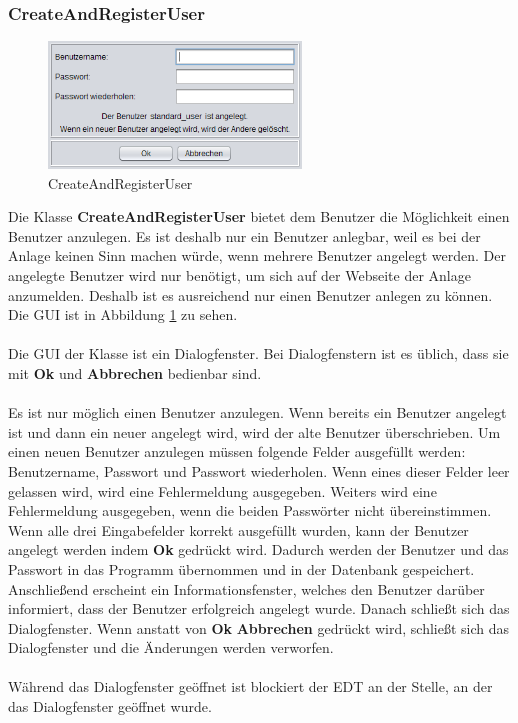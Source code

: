\subsubsection{CreateAndRegisterUser}
\begin{figure}
\vspace{-20pt}
  \begin{center}
    \includegraphics[width=0.60\textwidth]{Bilder/GUI/CreateUser}
  \end{center}
  \caption{CreateAndRegisterUser}
  \label{CreateAndRegisterUser}
  \vspace{10pt}
\end{figure}
Die Klasse \textbf{CreateAndRegisterUser} bietet dem Benutzer die Möglichkeit einen Benutzer anzulegen. Es ist deshalb nur ein Benutzer anlegbar, weil es bei der Anlage keinen Sinn machen würde, wenn mehrere Benutzer angelegt werden. Der angelegte Benutzer wird nur benötigt, um sich auf der Webseite der Anlage anzumelden. Deshalb ist es ausreichend nur einen Benutzer anlegen zu können. Die \ac{GUI} ist in Abbildung \ref{CreateAndRegisterUser} zu sehen.
\\ \\ Die \ac{GUI} der Klasse ist ein Dialogfenster. Bei Dialogfenstern ist es üblich, dass sie mit \textbf{Ok} und \textbf{Abbrechen} bedienbar sind.
\\ \\ Es ist nur möglich einen Benutzer anzulegen. Wenn bereits ein Benutzer angelegt ist und dann ein neuer angelegt wird, wird der alte Benutzer überschrieben. Um einen neuen Benutzer anzulegen müssen folgende Felder ausgefüllt werden: Benutzername, Passwort und Passwort wiederholen. Wenn eines dieser Felder leer gelassen wird, wird eine Fehlermeldung ausgegeben. Weiters wird eine Fehlermeldung ausgegeben, wenn die beiden Passwörter nicht übereinstimmen. Wenn alle drei Eingabefelder korrekt ausgefüllt wurden, kann der Benutzer angelegt werden indem \textbf{Ok} gedrückt wird. Dadurch werden der Benutzer und das Passwort in das Programm übernommen und in der Datenbank gespeichert. Anschließend erscheint ein Informationsfenster, welches den Benutzer darüber informiert, dass der Benutzer erfolgreich angelegt wurde. Danach schließt sich das Dialogfenster. Wenn anstatt von \textbf{Ok} \textbf{Abbrechen} gedrückt wird, schließt sich das Dialogfenster und die Änderungen werden verworfen.
\\ \\ Während das Dialogfenster geöffnet ist blockiert der \ac{EDT} an der Stelle, an der das Dialogfenster geöffnet wurde.

